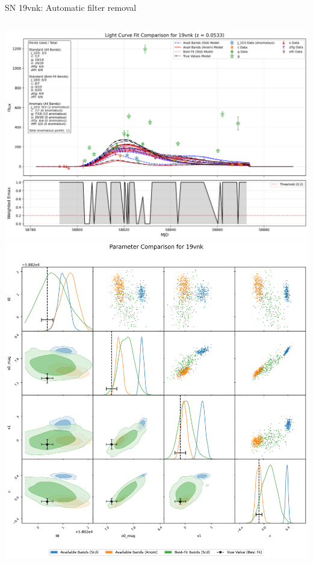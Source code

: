 \documentclass[aspectratio=169]{beamer}
\begin{document}
\begin{frame}{SN 19vnk: Automatic filter removal}
  \begin{columns}
    \includegraphics[width=1\textwidth]{images/light_curve_comparison_19vnk.png}
    \includegraphics[width=1\textwidth]{images/corner_comparison_19vnk.png}
  \end{columns}
\end{frame}
\end{document}
